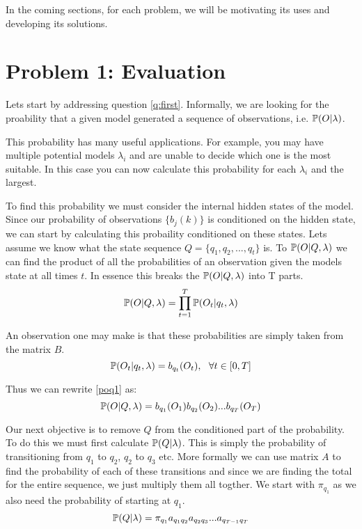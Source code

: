 In the coming sections, for each problem, we will be motivating its uses and developing its solutions. 

\section{Problem 1: Evaluation}
Lets start by addressing question \ref{q:first}. Informally, we are looking for the proability that a given model generated a sequence of observations, i.e. $\mathbb{P} (O | \lambda)$.

This probability has many useful applications. For example, you may have multiple potential models $\lambda_i$ and are unable to decide which one is the most suitable. In this case you can now calculate this probability for each $\lambda_i$ and the largest.

To find this probability we must consider the internal hidden states of the model. Since our probability of observations $\{b_j(k)\}$ is conditioned on the hidden state, we can start by calculating this probaility conditioned on these states. Lets assume we know what the state sequence $Q = \{q_1,q_2,...,q_t\}$ is. To $\mathbb{P} (O | Q, \lambda)$ we can find the product of all the probabilities of an observation given the models state at all times $t$. In essence this breaks the  $\mathbb{P} (O | Q, \lambda)$ into T parts. 
\begin{equation}
    \label{poq1}
    \mathbb{P} (O | Q, \lambda) = \prod_{t=1}^T \mathbb{P} (O_t | q_t, \lambda)
\end{equation}


An observation one may make is that these probabilities are simply taken from the matrix $B$. 
\begin{equation}
    \mathbb{P} (O_t | q_t, \lambda) = b_{q_t}(O_t), \ \ \forall t \in [0,T] 
\end{equation}

Thus we can rewrite \ref{poq1} as:
\begin{equation}
    \label{oqlam}
    \mathbb{P} (O | Q, \lambda) = b_{q_1}(O_1) b_{q_2}(O_2)  ...  b_{q_T}(O_T)
\end{equation}

Our next objective is to remove $Q$ from the conditioned part of the probability. To do this we must first calculate $\mathbb{P} (Q | \lambda)$. This is simply the probability of transitioning from $q_1$ to $q_2$, $q_2$ to $q_3$ etc. More formally we can use matrix $A$ to find the probability of each of these transitions and since we are finding the total for the entire sequence, we just multiply them all togther. We start with $\pi_{q_1}$ as we also need the probability of starting at $q_1$.
\begin{equation}
    \label{qlam}
    \mathbb{P} ( Q | \lambda) = \pi_{q_1} a_{q_1q_2} a_{q_2q_3} ... a_{q_{T-1}q_T}
\end{equation}

